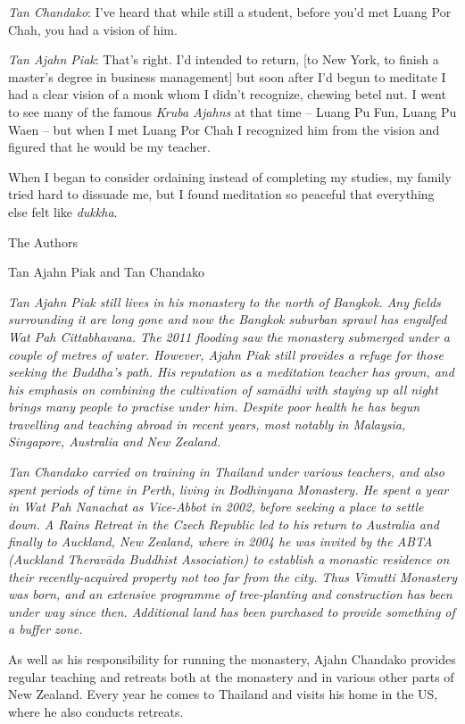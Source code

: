 \emph{Tan Chandako}: I've heard that while still a student, before you'd
met Luang Por Chah, you had a vision of him.

\emph{Tan Ajahn Piak}: That's right. I'd intended to return, {[}to New
York, to finish a master's degree in business management{]} but soon
after I'd begun to meditate I had a clear vision of a monk whom I didn't
recognize, chewing betel nut. I went to see many of the famous
\emph{Kruba Ajahns  } at that time -- Luang Pu Fun, Luang Pu Waen --
but when I met Luang Por Chah I recognized him from the vision and
figured that he would be my teacher.

When I began to consider ordaining instead of completing my studies, my
family tried hard to dissuade me, but I found meditation so peaceful
that everything else felt like \emph{dukkha}.



The Authors

Tan Ajahn Piak and Tan Chandako

\emph{Tan Ajahn Piak still lives in his monastery to the north of
Bangkok. Any fields surrounding it are long gone and now the Bangkok
suburban sprawl has engulfed Wat Pah Cittabhavana. The 2011 flooding saw
the monastery submerged under a couple of metres of water. However,
Ajahn Piak still provides a refuge for those seeking the Buddha's path.
His reputation as a meditation teacher has grown, and his emphasis on
combining the cultivation of samādhi with staying up all night brings
many people to practise under him. Despite poor health he has begun
travelling and teaching abroad in recent years, most notably in
Malaysia, Singapore, Australia and New Zealand.}

\emph{Tan Chandako carried on training in Thailand under various
teachers, and also spent periods of time in Perth, living in Bodhinyana
Monastery. He spent a year in Wat Pah Nanachat as Vice-Abbot in 2002,
before seeking a place to settle down. A Rains Retreat in the Czech
Republic led to his return to Australia and finally to Auckland, New
Zealand, where in 2004 he was invited by the ABTA (Auckland Theravāda 
Buddhist Association) to establish a monastic residence on their
recently-acquired property not too far from the city. Thus Vimutti
Monastery was born, and an extensive programme of tree-planting and
construction has been under way since then. Additional land has been
purchased to provide something of a buffer zone.}

As well as his responsibility for running the monastery, Ajahn Chandako
provides regular teaching and retreats both at the monastery and in
various other parts of New Zealand. Every year he comes to Thailand and
visits his home in the US, where he also conducts retreats.

